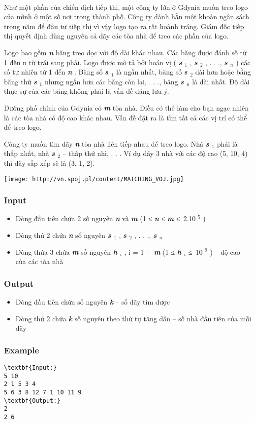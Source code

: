 

 

Như một phần của chiến dịch tiếp thị, một công ty lớn ở Gdynia muốn treo logo của mình ở một số nơi trong thành phố. Công ty dành hẳn một khoản ngân sách trong năm để đầu tư tiếp thị vì vậy logo tạo ra rất hoành tráng. Giám đốc tiếp thị quyết định dùng nguyên cả dãy các tòa nhà để treo các phần của logo.

Logo bao gồm \textbf{\emph{ n }} băng treo dọc với độ dài khác nhau. Các băng được đánh số từ 1 đến n từ trái sang phải. Logo được mô tả bởi hoán vị ( \textbf{\emph{ s $_ 1 $}} , \textbf{\emph{ s $_ 2 $}} , . . ., \textbf{\emph{ s $_ n $}} ) các số tự nhiên từ 1 đến \textbf{\emph{ n }} . Băng số \textbf{\emph{ s $_ 1 $}} là ngắn nhất, băng số \textbf{\emph{ s $_ 2 $}} dài hơn hoặc bằng băng thứ \textbf{\emph{ s $_ 1 $}} nhưng ngắn hơn các băng còn lại, . . ., băng \textbf{\emph{ s $_ n $}} là dài nhất. Độ dài thực sự của các băng không phải là vấn đề đáng lưu ý.

Đường phố chính của Gdynia có \textbf{\emph{ m }} tòa nhà. Điều có thể làm cho bạn ngạc nhiên là các tòa nhà có độ cao khác nhau. Vấn đề đặt ra là tìm tất cả các vị trí có thể để treo logo.

Công ty muốn tìm dãy \textbf{\emph{ n }} tòa nhà liên tiếp nhau để treo logo. Nhà \textbf{\emph{ s $_ 1 $}} phải là thấp nhất, nhà \textbf{\emph{ s $_ 2 $}} – thấp thứ nhì, . . . Ví dụ dãy 3 nhà với các độ cao (5, 10, 4) thì dãy sắp xếp sẽ là (3, 1, 2).


\texttt{[image: http://vn.spoj.pl/content/MATCHING\_VOJ.jpg]}

\subsubsection{Input}
\begin{itemize}
	\item Dòng đầu tiên chứa 2 số nguyên \textbf{\emph{ n }} và \textbf{\emph{ m }} (1 ≤ \textbf{\emph{ n }} ≤ \textbf{\emph{ m }} ≤ 2.10 $^ 5 $ )
	\item Dòng thứ 2 chứa \textbf{\emph{ n }} số nguyên \textbf{\emph{ s $_ 1 $}} , \textbf{\emph{ s $_ 2 $}} , . . ., \textbf{\emph{ s $_ n $}}
	\item Dòng thứa 3 chứa \textbf{\emph{ m }} số nguyên \textbf{\emph{ h $_ i $}} , i = 1 ÷ \textbf{\emph{ m }} (1 ≤ \textbf{\emph{ h $_ i $}} ≤ 10 $^ 9 $ ) – độ cao của các tòa nhà
\end{itemize}

\subsubsection{Output}
\begin{itemize}
	\item Dòng đầu tiên chứa số nguyên \textbf{\emph{ k }} – số dãy tìm được
	\item Dòng thứ 2 chứa \textbf{\emph{ k }} số nguyên theo thứ tự tăng dần – số nhà đầu tiên của mỗi dãy
\end{itemize}

\subsubsection{Example}
\begin{verbatim}
\textbf{Input:}
5 10
2 1 5 3 4
5 6 3 8 12 7 1 10 11 9
\textbf{Output:}
2
2 6\end{verbatim}